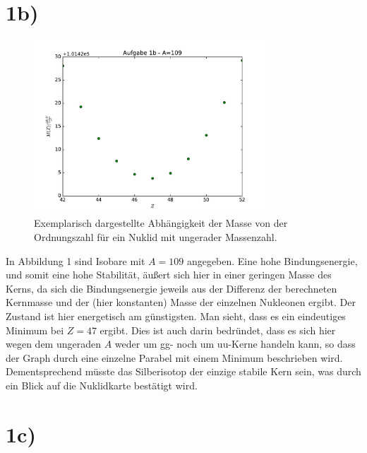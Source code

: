 \section{1b)}
\begin{figure}
  \centering
  \label{fig:1}
  \includegraphics[height=6.5cm]{1b_2.pdf}
  \caption{Exemplarisch dargestellte Abhängigkeit der Masse von der Ordnungszahl für ein Nuklid mit ungerader Massenzahl.}
\end{figure}
In Abbildung 1 sind Isobare mit $A = 109$ angegeben. Eine hohe Bindungsenergie, und somit eine hohe Stabilität, äußert sich hier in einer geringen Masse des Kerns, da sich die Bindungsenergie jeweils aus der Differenz der berechneten Kernmasse und der (hier konstanten) Masse der einzelnen Nukleonen ergibt. Der Zustand ist hier energetisch am günstigsten.
Man sieht, dass es ein eindeutiges Minimum bei $Z=47$ ergibt. Dies ist auch darin bedründet, dass es sich hier wegen dem ungeraden $A$ weder um gg- noch um uu-Kerne handeln kann, so dass der Graph durch eine einzelne Parabel mit einem Minimum beschrieben wird. Dementsprechend müsste das Silberisotop der einzige stabile Kern sein, was durch ein Blick auf die Nuklidkarte bestätigt wird.


\section{1c)}

